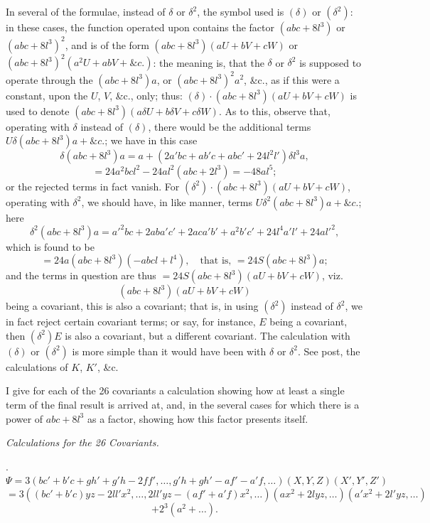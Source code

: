 \documentclass[11pt,a4paper]{article}
\begin{document}
\newpage
\noindent
In several of the formulae, instead of $\delta$ or $\delta^{2}$, the
symbol used is $(\delta)$ or $(\delta^{2})$: in these cases, the
function operated upon contains the factor $(abc+8l^{3})$ or
$(abc+8l^{3})^{2}$, and is of the form $(abc+8l^{3})(aU+bV+cW)$ or
$(abc+8l^{3})^{2}(a^{2}U+abV+\&c.)$: the meaning is, that the $\delta$
or $\delta^{2}$ is supposed to operate through the $(abc+8l^{3})a$, or
$(abc+8l^{3})^{2}a^{2}$, \&c., as if this were a constant, upon the
$U$, $V$, \&c., only; thus: $(\delta)\cdot(abc+8l^{3})(aU+bV+cW)$ is
used to denote $(abc+8l^{3})(a\delta U+b\delta V+c\delta W)$. As to
this, observe that, operating with $\delta$ instead of $(\delta)$,
there would be the additional terms $U\delta(abc+8l^{3})a+\&c.$; we
have in this case
\[
  \delta(abc+8l^{3})a=a+(2a'bc+ab'c+abc'+24l^{2}l')\delta l^{3}a,
\]
\[
  =24a^{2}bcl^{2}-24al^{2}(abc+2l^{3})=-48al^{5};
\]
or the rejected terms in fact vanish. For
$(\delta^{2})\cdot(abc+8l^{3})(aU+bV+cW)$, operating with $\delta^{2}$,
we should have, in like manner, terms $U\delta^{2}(abc+8l^{3})a+\&c.$;
here
\[
  \delta^{2}(abc+8l^{3})a=a'^{2}bc+2aba'c'+2aca'b'+a^{2}b'c'+24l^{4}a'l'+24al'^{2},
\]
which is found to be
\[
  =24a(abc+8l^{3})(-abcl+l^{4}),\quad\text{that is, } =24S(abc+8l^{3})a;
\]
and the terms in question are thus $=24S(abc+8l^{3})(aU+bV+cW)$, viz.
\[
  (abc+8l^{3})(aU+bV+cW)
\]
being a covariant, this is also a covariant; that is, in using
$(\delta^{2})$ instead of $\delta^{2}$, we in fact reject certain
covariant terms; or say, for instance, $E$ being a covariant, then
$(\delta^{2})E$ is also a covariant, but a different covariant. The
calculation with $(\delta)$ or $(\delta^{2})$ is more simple than it
would have been with $\delta$ or $\delta^{2}$. See post, the
calculations of $K$, $K'$, \&c.

I give for each of the 26 covariants a calculation showing how at least
a single term of the final result is arrived at, and, in the several
cases for which there is a power of $abc+8l^{3}$ as a factor, showing
how this factor presents itself.

\begin{center}
\textit{Calculations for the 26 Covariants.}
\end{center}

. \quad $\Psi=3(bc'+b'c+gh'+g'h-2ff',\ldots,g'h+gh'-af'-a'f,\ldots)(X,Y,Z)(X',Y',Z')$
\[
  = 3((bc'+b'c)yz-2ll'x^{2},\ldots,2ll'yz-(af'+a'f)x^{2},\ldots)(ax^{2}+2lyz,\ldots)(a'x^{2}+2l'yz,\ldots)
\]
\[
  +2^{3}(a^{2}+\ldots).
\]
\end{document}
